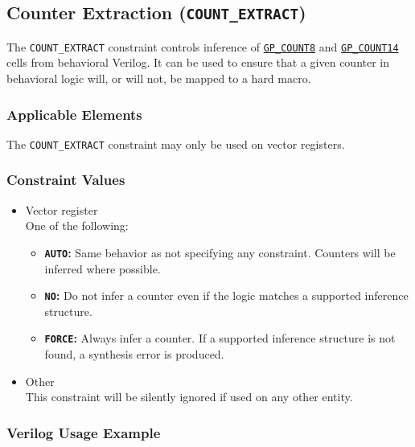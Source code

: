 \documentclass[11pt]{article}
\newcommand{\tokenstyle}[1]{\texttt{#1}}
\newcommand{\valuestyle}[1]{\texttt{#1}}
\newcommand{\strvaluestyle}[1]{\valuestyle{\textquotedbl#1\textquotedbl}}
\newcommand{\strexamplestyle}[1]{\textbf{\strvaluestyle{#1}:}}
\newcommand{\whenstyle}[1]{{\fontseries{sb}\selectfont#1}}
\newcommand{\tokenref}[2]{\hyperref[#2]{\tokenstyle{#1}}}
\begin{document}

\pagebreak
\subsection{Counter Extraction (\tokenstyle{COUNT\_EXTRACT})}
\label{count-extract}

The \tokenstyle{COUNT\_EXTRACT} constraint controls inference of \tokenref{GP\_COUNT8}{gp-count8} and \tokenref{GP\_COUNT14}{gp-count14} cells from behavioral Verilog. It can be
used to ensure that a given counter in behavioral logic will, or will not, be mapped to a hard macro.

\subsubsection{Applicable Elements}
The \tokenstyle{COUNT\_EXTRACT} constraint may only be used on vector registers.

\subsubsection{Constraint Values}
\begin{itemize}
\item \whenstyle{Vector register}\\
One of the following:
\begin{itemize}
\item \strexamplestyle{AUTO} Same behavior as not specifying any constraint. Counters will be inferred where possible.
\item \strexamplestyle{NO} Do not infer a counter even if the logic matches a supported inference structure.
\item \strexamplestyle{FORCE} Always infer a counter. If a supported inference structure is not found, a synthesis error is produced.
\end{itemize}
\item \whenstyle{Other} \\
This constraint will be silently ignored if used on any other entity.
\end{itemize}

\subsubsection{Verilog Usage Example}
\end{document}
